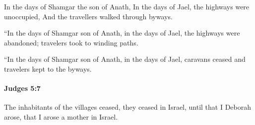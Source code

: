 			\begin{versebox}
					\item[BHS] 
					\item[ASV] In the days of Shamgar the son of Anath, In the days of Jael, the highways were unoccupied, And the travellers walked through byways.
					\item[NIV] “In the days of Shamgar son of Anath, in the days of Jael, the highways were abandoned; travelers took to winding paths.
					\item[NRSV] “In the days of Shamgar son of Anath, in the days of Jael, caravans ceased and travelers kept to the byways.
			\end{versebox}

		\paragraph{Judges 5:7} %
			\label{JUDGES-5-7}

			The inhabitants of the villages ceased, they ceased in Israel, until that I Deborah arose, that I arose a mother in Israel.

